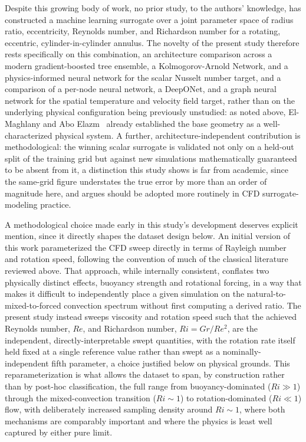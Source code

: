 Despite this growing body of work, no prior study, to the authors' knowledge, has constructed a machine learning surrogate over a joint parameter space of radius ratio, eccentricity, Reynolds number, and Richardson number for a rotating, eccentric, cylinder-in-cylinder annulus. The novelty of the present study therefore rests specifically on this combination, an architecture comparison across a modern gradient-boosted tree ensemble, a Kolmogorov-Arnold Network, and a physics-informed neural network for the scalar Nusselt number target, and a comparison of a per-node neural network, a DeepONet, and a graph neural network for the spatial temperature and velocity field target, rather than on the underlying physical configuration being previously unstudied: as noted above, El-Maghlany and Abo Elazm~\cite{ElMaghlany2016} already established the base geometry as a well-characterized physical system. A further, architecture-independent contribution is methodological: the winning scalar surrogate is validated not only on a held-out split of the training grid but against new simulations mathematically guaranteed to be absent from it, a distinction this study shows is far from academic, since the same-grid figure understates the true error by more than an order of magnitude here, and argues should be adopted more routinely in CFD surrogate-modeling practice.

A methodological choice made early in this study's development deserves explicit mention, since it directly shapes the dataset design below. An initial version of this work parameterized the CFD sweep directly in terms of Rayleigh number and rotation speed, following the convention of much of the classical literature reviewed above. That approach, while internally consistent, conflates two physically distinct effects, buoyancy strength and rotational forcing, in a way that makes it difficult to independently place a given simulation on the natural-to-mixed-to-forced convection spectrum without first computing a derived ratio. The present study instead sweeps viscosity and rotation speed such that the achieved Reynolds number, $Re$, and Richardson number, $Ri=Gr/Re^2$, are the independent, directly-interpretable swept quantities, with the rotation rate itself held fixed at a single reference value rather than swept as a nominally-independent fifth parameter, a choice justified below on physical grounds. This reparameterization is what allows the dataset to span, by construction rather than by post-hoc classification, the full range from buoyancy-dominated ($Ri \gg 1$) through the mixed-convection transition ($Ri \sim 1$) to rotation-dominated ($Ri \ll 1$) flow, with deliberately increased sampling density around $Ri\sim1$, where both mechanisms are comparably important and where the physics is least well captured by either pure limit.

